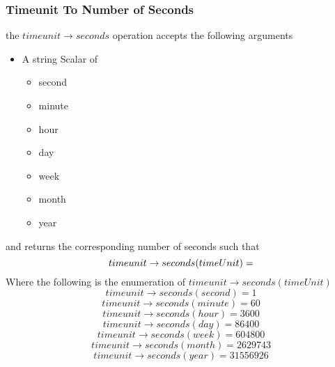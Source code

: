 \documentclass[../main.tex]{subfiles}
\begin{document}
\subsubsection{Timeunit To Number of Seconds}
the $timeunit \to seconds$ operation accepts the following arguments

\begin{itemize}
\item A string Scalar of
  \begin{itemize}
  \item second
  \item minute
  \item hour
  \item day
  \item week
  \item month
  \item year
  \end{itemize}
\end{itemize}
and returns the corresponding number of seconds such that
$$timeunit \to seconds(timeUnit) = \real$$
Where the following is the enumeration of $timeunit \to seconds(timeUnit)$
$$timeunit \to seconds(second) = 1$$
$$timeunit \to seconds(minute) = 60$$
$$timeunit \to seconds(hour) = 3600$$
$$timeunit \to seconds(day) = 86400$$
$$timeunit \to seconds(week) = 604800$$
$$timeunit \to seconds(month) = 2629743$$
$$timeunit \to seconds(year) = 31556926$$
\end{document}
